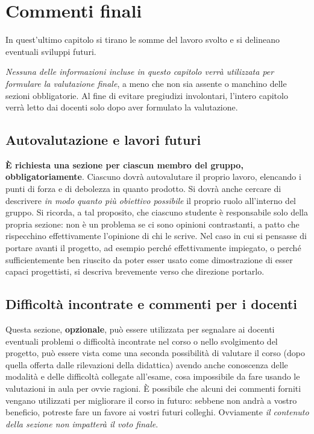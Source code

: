 \documentclass[a4paper,12pt]{report}
\begin{document}
\chapter{Commenti finali}

In quest'ultimo capitolo si tirano le somme del lavoro svolto e si delineano eventuali sviluppi
futuri.

\textit{Nessuna delle informazioni incluse in questo capitolo verrà utilizzata per formulare la valutazione finale}, a meno che non sia assente o manchino delle sezioni obbligatorie.
%
Al fine di evitare pregiudizi involontari, l'intero capitolo verrà letto dai docenti solo dopo aver formulato la valutazione.

\section{Autovalutazione e lavori futuri}

\textbf{È richiesta una sezione per ciascun membro del gruppo, obbligatoriamente}.
%
Ciascuno dovrà autovalutare il proprio lavoro, elencando i punti di forza e di debolezza in quanto prodotto.
Si dovrà anche cercare di descrivere \emph{in modo quanto più obiettivo possibile} il proprio ruolo all'interno del gruppo.
Si ricorda, a tal proposito, che ciascuno studente è responsabile solo della propria sezione: non è un problema se ci sono opinioni contrastanti, a patto che rispecchino effettivamente l'opinione di chi le scrive.
Nel caso in cui si pensasse di portare avanti il progetto, ad esempio perché effettivamente impiegato, o perché sufficientemente ben riuscito da poter esser usato come dimostrazione di esser capaci progettisti, si descriva brevemente verso che direzione portarlo.

\section{Difficoltà incontrate e commenti per i docenti}

Questa sezione, \textbf{opzionale}, può essere utilizzata per segnalare ai docenti eventuali problemi o difficoltà incontrate nel corso o nello svolgimento del progetto, può essere vista come una seconda possibilità di valutare il corso (dopo quella offerta dalle rilevazioni della didattica) avendo anche conoscenza delle modalità e delle difficoltà collegate all'esame, cosa impossibile da fare usando le valutazioni in aula per ovvie ragioni.
%
È possibile che alcuni dei commenti forniti vengano utilizzati per migliorare il corso in futuro: sebbene non andrà a vostro beneficio, potreste fare un favore ai vostri futuri colleghi.
%
Ovviamente \textit{il contenuto della sezione non impatterà il voto finale}.
\end{document}
